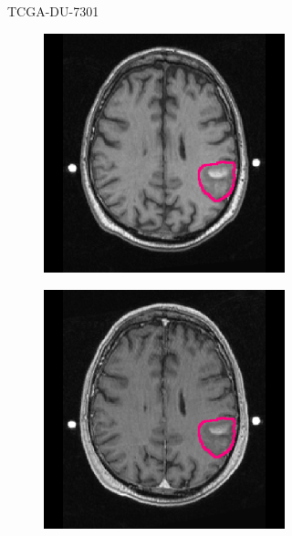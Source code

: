 \begin{subappendices}
\begin{figure}[htbp]
\begin{subfigure}[b]{0.8\textwidth}
\begin{subfigure}[b]{0.215\textwidth}
        \end{subfigure}
        \caption{TCGA-DU-7301}
    \end{subfigure}
    \begin{subfigure}[b]{0.8\textwidth}
        \centering
        \hfill
        \begin{subfigure}[b]{0.215\textwidth}
        \includegraphics[width=\textwidth, clip, trim=2.5cm 0.5cm 2.5cm 0.5cm]{Figures/Random_segs/T1_TCGA-FG-5964.png}
        \end{subfigure}
        \hfill
        \begin{subfigure}[b]{0.215\textwidth}
        \includegraphics[width=\textwidth, clip, trim=2.5cm 0.5cm 2.5cm 0.5cm]{Figures/Random_segs/T1GD_TCGA-FG-5964.png}

\end{subfigure}
\end{subfigure}
\end{figure}
\end{subappendices}
